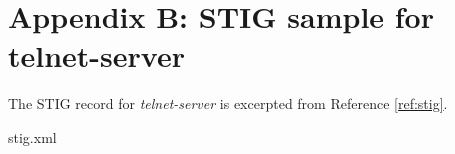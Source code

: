 \documentclass[12pt]{article}
\begin{document}
%
\newpage
\section{Appendix B: STIG sample for telnet-server}

The STIG record for \emph{telnet-server} is excerpted from Reference
\ref{ref:stig}.

\lstset{
    language=xml,
    basicstyle=\footnotesize\ttfamily,
    linewidth=7.6in,
    frame=single,
    showstringspaces=false
}
\begin{adjustwidth}{-0.5in}{0.0in}
\begin{lstinputlisting}[caption={STIG XML sample},
label={lst:stig_xml}]{stig.xml}
\end{lstinputlisting}
\end{adjustwidth}
\vspace{0.8cm}


\end{document}
